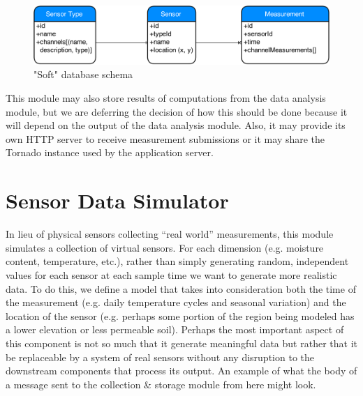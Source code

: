 \documentclass{article}
\begin{document}
\begin{figure}[htb]
\begin{center}
   \includegraphics[width=1\linewidth]{Images/DB-Schema.png}
\end{center}
\vspace{-0.2in}
   \caption{"Soft" database schema}
   \label{fig:db-soft-schema}
\end{figure}

This module may also store results of computations from the data analysis module, 
but we are deferring the decision of how this should be done because it will depend
on the output of the data analysis module.
Also, it may provide its own HTTP server to receive measurement submissions
or it may share the Tornado instance used by the application server.


\section{Sensor Data Simulator}
In lieu of physical sensors collecting ``real world'' measurements,
this module simulates a collection of virtual sensors.
For each dimension (e.g. moisture content, temperature, etc.), rather than simply
generating random, independent values for each sensor at each sample time
we want to generate more realistic data.
To do this, we define a model that takes into consideration both
the time of the measurement (e.g. daily temperature cycles and seasonal variation) and
the location of the sensor (e.g. perhaps some portion of the region being modeled has a lower elevation or less permeable soil).
Perhaps the most important aspect of this component is not so much that it generate meaningful data
but rather that it be replaceable by a system of real sensors without any disruption to the downstream
components that process its output.
An example of what the body of a message
sent to the collection \& storage module from here might look.
\end{document}
